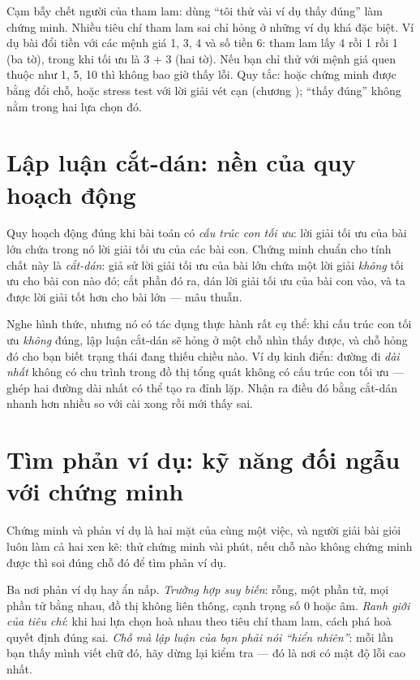 \documentclass[../../algorithm.tex]{subfiles}
\begin{document}
\begin{cambay}
Cạm bẫy chết người của tham lam: dùng ``tôi thử vài ví dụ thấy đúng'' làm chứng minh. Nhiều tiêu chí tham lam sai chỉ hỏng ở những ví dụ khá đặc biệt. Ví dụ bài đổi tiền với các mệnh giá 1, 3, 4 và số tiền 6: tham lam lấy 4 rồi 1 rồi 1 (ba tờ), trong khi tối ưu là 3 + 3 (hai tờ). Nếu bạn chỉ thử với mệnh giá quen thuộc như 1, 5, 10 thì không bao giờ thấy lỗi. Quy tắc: hoặc chứng minh được bằng đổi chỗ, hoặc stress test với lời giải vét cạn (chương ); ``thấy đúng'' không nằm trong hai lựa chọn đó.
\end{cambay}

\section{Lập luận cắt-dán: nền của quy hoạch động}

Quy hoạch động đúng khi bài toán có \emph{cấu trúc con tối ưu}: lời giải tối ưu của bài lớn chứa trong nó lời giải tối ưu của các bài con. Chứng minh chuẩn cho tính chất này là \emph{cắt-dán}: giả sử lời giải tối ưu của bài lớn chứa một lời giải \emph{không} tối ưu cho bài con nào đó; cắt phần đó ra, dán lời giải tối ưu của bài con vào, và ta được lời giải tốt hơn cho bài lớn --- mâu thuẫn.

Nghe hình thức, nhưng nó có tác dụng thực hành rất cụ thể: khi cấu trúc con tối ưu \emph{không} đúng, lập luận cắt-dán sẽ hỏng ở một chỗ nhìn thấy được, và chỗ hỏng đó cho bạn biết trạng thái đang thiếu chiều nào. Ví dụ kinh điển: đường đi \emph{dài nhất} không có chu trình trong đồ thị tổng quát không có cấu trúc con tối ưu --- ghép hai đường dài nhất có thể tạo ra đỉnh lặp. Nhận ra điều đó bằng cắt-dán nhanh hơn nhiều so với cài xong rồi mới thấy sai.

\section{Tìm phản ví dụ: kỹ năng đối ngẫu với chứng minh}

Chứng minh và phản ví dụ là hai mặt của cùng một việc, và người giải bài giỏi luôn làm cả hai xen kẽ: thử chứng minh vài phút, nếu chỗ nào không chứng minh được thì soi đúng chỗ đó để tìm phản ví dụ.

Ba nơi phản ví dụ hay ẩn nấp. \emph{Trường hợp suy biến}: rỗng, một phần tử, mọi phần tử bằng nhau, đồ thị không liên thông, cạnh trọng số 0 hoặc âm. \emph{Ranh giới của tiêu chí}: khi hai lựa chọn hoà nhau theo tiêu chí tham lam, cách phá hoà quyết định đúng sai. \emph{Chỗ mà lập luận của bạn phải nói ``hiển nhiên''}: mỗi lần bạn thấy mình viết chữ đó, hãy dừng lại kiểm tra --- đó là nơi có mật độ lỗi cao nhất.
\end{document}
